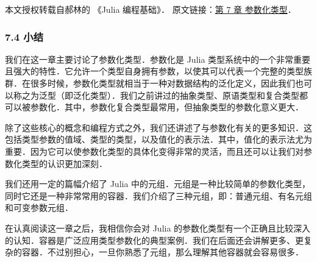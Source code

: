 
本文授权转载自郝林的 《Julia 编程基础》． 原文链接：\href{https://github.com/hyper0x/JuliaBasics/blob/master/book/ch07.md}{第 7 章 参数化类型}．


\subsubsection{7.4 小结}

我们在这一章主要讨论了参数化类型．参数化是 Julia 类型系统中的一个非常重要且强大的特性．它允许一个类型自身拥有参数，以使其可以代表一个完整的类型族群．在很多时候，参数化类型就相当于一种对数据结构的泛化定义，因此我们也可以称之为泛型（即泛化类型）．我们之前讲过的抽象类型、原语类型和复合类型都可以被参数化．其中，参数化复合类型最常用，但抽象类型的参数化意义更大．

除了这些核心的概念和编程方式之外，我们还讲述了与参数化有关的更多知识．这包括类型参数的值域、类型的类型，以及值化的表示法．其中，值化的表示法尤为重要．因为它可以使参数化类型的具体化变得非常的灵活，而且还可以让我们对参数化类型的认识更加深刻．

我们还用一定的篇幅介绍了 Julia 中的元组．元组是一种比较简单的参数化类型，同时它还是一种非常常用的容器．我们介绍了三种元组，即：普通元组、有名元组和可变参数元组．

在认真阅读这一章之后，我相信你会对 Julia 的参数化类型有一个正确且比较深入的认知．容器是广泛应用类型参数化的典型案例．我们在后面还会讲解更多、更复杂的容器．不过别担心，一旦你熟悉了元组，那么理解其他容器就会容易很多．